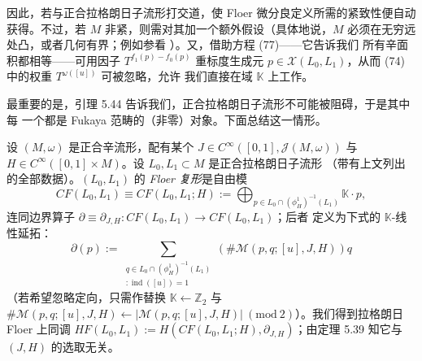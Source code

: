

因此，若与正合拉格朗日子流形打交道，使 Floer 微分良定义所需的紧致性便自动
获得。不过，若 $M$ 非紧，则需对其加一个额外假设（具体地说，$M$ 必须在无穷远
处凸，或者几何有界；例如参看 \cite{CGK02}）。又，借助方程 (77)——它告诉我们
所有辛面积都相等——可用因子 $T^{f_1(p)-f_0(p)}$ 重标度生成元
$p\in\mathcal X(L_0,L_1)$，从而 (74) 中的权重 $T^{\omega([u])}$ 可被忽略，允许
我们直接在域 $\mathbb K$ 上工作。


最重要的是，引理 5.44 告诉我们，正合拉格朗日子流形不可能被阻碍，于是其中每
一个都是 Fukaya 范畴的（非零）对象。下面总结这一情形。

\begin{Def}\label{def:5.45}
设 $(M,\omega)$ 是正合辛流形，配有某个
$J\in C^\infty([0,1],\mathcal J(M,\omega))$ 与
$H\in C^\infty([0,1]\times M)$。设 $L_0,L_1\subset M$ 是正合拉格朗日子流形
（带有上文列出的全部数据）。$(L_0,L_1)$ 的 \emph{Floer 复形}是自由模
\[
CF(L_0,L_1)\equiv CF(L_0,L_1;H):=
\bigoplus_{p\in L_0\cap(\phi_H^1)^{-1}(L_1)}\mathbb K\cdot p,
\]
连同边界算子 $\partial\equiv\partial_{J,H}:CF(L_0,L_1)\to CF(L_0,L_1)$；后者
定义为下式的 $\mathbb K$-线性延拓：
\[
\partial(p):=\sum_{\substack{q\in L_0\cap(\phi_H^1)^{-1}(L_1)\\
[u]:\operatorname{ind}([u])=1}}
\left(\#\mathcal M(p,q;[u],J,H)\right)q
\]
（若希望忽略定向，只需作替换 $\mathbb K\leftarrow\mathbb Z_2$ 与
$\#\mathcal M(p,q;[u],J,H)\leftarrow
|\mathcal M(p,q;[u],J,H)|\ (\mathrm{mod}\ 2)$）。我们得到拉格朗日 Floer 上同调
$HF(L_0,L_1):=H(CF(L_0,L_1;H),\partial_{J,H})$；由定理 5.39 知它与
$(J,H)$ 的选取无关。
\end{Def}


